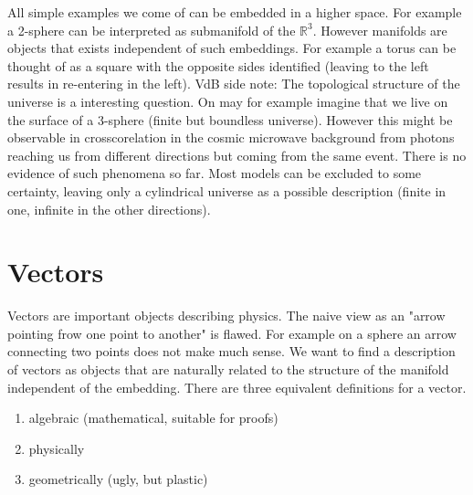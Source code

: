 All simple examples we come of can be embedded in a higher space. 
For example a 2-sphere can be interpreted as submanifold of the $\mathbb{R}^3$. 
However manifolds are objects that exists independent of such embeddings. 
For example a torus can be thought of as a square with the opposite sides identified (leaving to the left results in re-entering in the left).
VdB side note: The topological structure of the universe is a interesting question.  
On may for example imagine that we live on the surface of a 3-sphere (finite but boundless universe). 
However this might be observable in crosscorelation in the cosmic microwave background from photons reaching us 
from different directions but coming from the same event. There is no evidence of such phenomena so far. 
Most models can be excluded to some certainty, leaving only a cylindrical universe as a possible description 
(finite in one, infinite in the other directions).
\section{Vectors}
Vectors are important objects describing physics. The naive view as an "arrow pointing frow one point to another" is flawed. 
For example on a sphere an arrow connecting two points does not make much sense.
We want to find a description of vectors as objects that are naturally related to the structure of the manifold independent of the embedding.
There are three equivalent definitions for a vector.
\begin{enumerate}
    \item algebraic (mathematical, suitable for proofs)
    \item physically
    \item geometrically (ugly, but plastic)
\end{enumerate}
